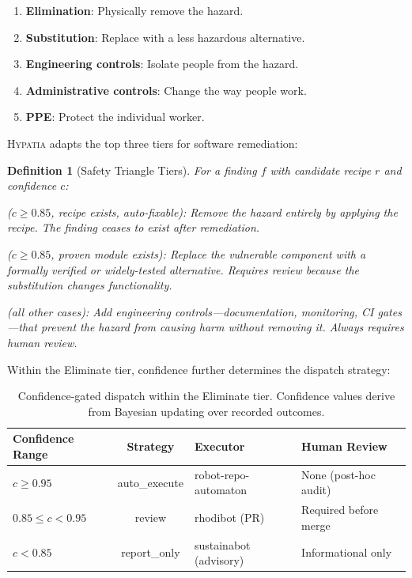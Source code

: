 \documentclass[11pt,a4paper]{article}
\newtheorem{definition}{Definition}
\begin{document}
\begin{enumerate}[nosep]
  \item \textbf{Elimination}: Physically remove the hazard.
  \item \textbf{Substitution}: Replace with a less hazardous alternative.
  \item \textbf{Engineering controls}: Isolate people from the hazard.
  \item \textbf{Administrative controls}: Change the way people work.
  \item \textbf{PPE}: Protect the individual worker.
\end{enumerate}

\textsc{Hypatia} adapts the top three tiers for software remediation:

\begin{definition}[Safety Triangle Tiers]
\label{def:triangle}
For a finding $f$ with candidate recipe $r$ and confidence $c$:
\begin{description}[nosep]
  \item[Eliminate] ($c \geq 0.85$, recipe exists, auto-fixable): Remove the hazard entirely by applying the recipe. The finding ceases to exist after remediation.
  \item[Substitute] ($c \geq 0.85$, proven module exists): Replace the vulnerable component with a formally verified or widely-tested alternative. Requires review because the substitution changes functionality.
  \item[Control] (all other cases): Add engineering controls---documentation, monitoring, CI gates---that prevent the hazard from causing harm without removing it. Always requires human review.
\end{description}
\end{definition}

Within the Eliminate tier, confidence further determines the dispatch strategy:

\begin{table}[htbp]
\centering
\caption{Confidence-gated dispatch within the Eliminate tier. Confidence values derive from Bayesian updating over recorded outcomes.}
\label{tab:dispatch}
\begin{tabular}{@{}lcll@{}}
\toprule
\textbf{Confidence Range} & \textbf{Strategy} & \textbf{Executor} & \textbf{Human Review} \\
\midrule
$c \geq 0.95$ & auto\_execute & robot-repo-automaton & None (post-hoc audit) \\
$0.85 \leq c < 0.95$ & review & rhodibot (PR) & Required before merge \\
$c < 0.85$ & report\_only & sustainabot (advisory) & Informational only \\
\bottomrule
\end{tabular}
\end{table}
\end{document}
